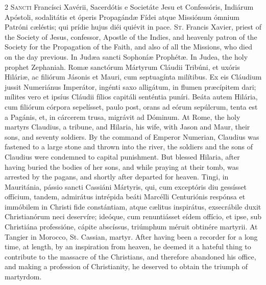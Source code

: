 \begin{paracol}{2}
\lettrine[lines=2]{S}{ancti} Francísci 
 Xavérii, Sacerdótis e Societáte Jesu et Confessóris, Indiárum Apóstoli, 
 sodalitátis et óperis Propagándæ Fídei atque Missiónum ómnium Patróni 
 cæléstis; qui prídie hujus diéi quiévit in pace.
\switchcolumn
{}
\lettrine[lines=2]{S}{t.} Francis Xavier, priest of the 
 Society of Jesus, confessor, Apostle of the Indies, and heavenly patron of 
 the Society for the Propagation of the Faith, and also of all the Missions, 
 who died on the day previous.
\switchcolumn*
{}
In Judæa sancti Sophoníæ Prophétæ.
\switchcolumn
{}
In Judea, the holy prophet Zephaniah.
\switchcolumn*
{}
Romæ sanctórum Mártyrum 
 Cláudii Tribúni, et uxóris Hiláriæ, ac filiórum Jásonis et Mauri, cum 
 septuagínta milítibus. Ex eis Cláudium jussit Numeriánus Imperátor, 
 ingénti saxo alligátum, in flumen præcípitem dari; mílites
 vero et ipsíus 
 Cláudii fílios capitáli senténtia puníri. Beáta autem Hilária, cum 
 filiórum córpora sepelísset, paulo post, orans ad eórum sepúlcrum, tenta est 
 a Pagánis, et, in cárcerem trusa, migrávit ad Dóminum.
\switchcolumn
{}
At Rome, the holy martyrs Claudius, 
 a tribune, and Hilaria, his wife, with Jason and Maur, their sons, and 
 seventy soldiers. By the command of Emperor Numerian, Claudius was 
 fastened to a large stone and thrown into the river, the soldiers and the 
 sons of Claudius were condemned to capital punishment. But blessed 
 Hilaria, after having buried the bodies of her sons, and while praying at 
 their tomb, was arrested by the pagans, and shortly after departed for 
 heaven.
\switchcolumn*
{}
Tingi, in Mauritánia, pássio sancti Cassiáni Mártyris, qui, cum exceptóris diu gessísset offícium, 
 tandem, admirátus intrépida beáti Marcélli Centuriónis respónsa et immóbilem 
 in Christi fide constántiam, atque cælitus inspirátus, exsecrábile duxit 
 Christianórum neci deservíre; ideóque, cum renuntiásset eídem offício, et 
 ipse, sub Christiána professióne, cápite abscíssus, triúmphum méruit 
 obtinére martyrii.
\switchcolumn
{}
At Tangier in Morocco, St. Cassian, 
 martyr. After having been a recorder for a long time, at length, by an 
 inspiration from heaven, he deemed it a hateful thing to contribute to the 
 massacre of the Christians, and therefore abandoned his office, and making a 
 profession of Christianity, he deserved to obtain the triumph of martyrdom.
\switchcolumn*

\end{paracol}
